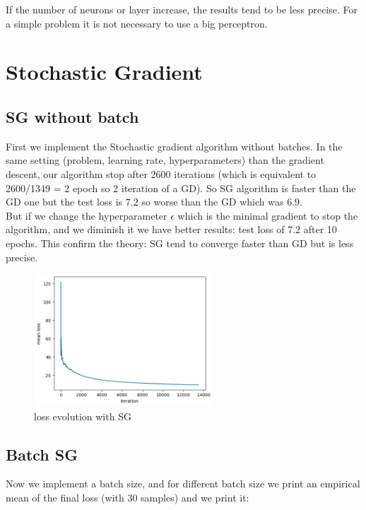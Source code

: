 \documentclass{article}
\begin{document}
    If the number of neurons or layer increase, the results tend to be less precise. For a simple problem it is not necessary to use a big perceptron.

    

\section{Stochastic Gradient}
    \subsection{SG without batch}

    First we implement the Stochastic gradient algorithm without batches. In the same setting (problem, learning rate, hyperparameters) than the gradient descent, our algorithm stop after 2600 iterations (which is equivalent to 2600/1349 = 2 epoch so 2 iteration of a GD). So SG algorithm is faster than the GD one but the test loss is $7.2$ so worse than the GD which was $6.9$. \\

    But if we change the hyperparameter $\epsilon$ which is the minimal gradient to stop the algorithm, and we diminish it we have better results: test loss of $7.2$ after 10 epochs. This confirm the theory: SG tend to converge faster than GD but is less precise.
    \begin{figure}[!h]
    \centering
    \includegraphics[width=0.6\textwidth]{images/part3_SGD.png}
    \caption{loss evolution with SG}
    \label{fig:sg1}
    \end{figure}      

    \newpage

    \subsection{Batch SG}

    Now we implement a batch size, and for different batch size we print an empirical mean of the final loss (with 30 samples) and we print it:
\end{document}
